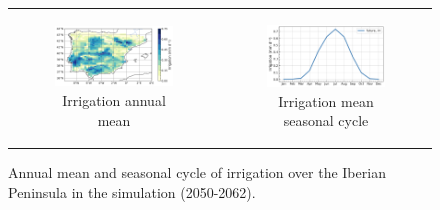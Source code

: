 \begin{figure}[htbp]
    \centering
    \begin{tabular}{cc}
        \begin{subfigure}[b]{0.48\textwidth}
            \caption{Irrigation annual mean}
            \includegraphics[width=\textwidth]{images/chap4/future/map_irrigation_fut.png}
        \end{subfigure} &
        \begin{subfigure}[b]{0.46\textwidth}
            \caption{Irrigation mean seasonal cycle}
            \includegraphics[width=\textwidth]{images/chap4/future/SC_irrigation_fut.png}
        \end{subfigure}
    \end{tabular}
    \caption{Annual mean and seasonal cycle of irrigation over the Iberian Peninsula in the \futirr simulation (2050-2062).}
    \label{fig:future_irrig}
\end{figure}


